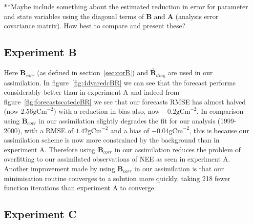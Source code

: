 \documentclass[11pt]{article}
\begin{document}
{\color{red} **Maybe include something about the estimated reduction in error for parameter and state variables using the diagonal terms of \textbf{B} and \textbf{A} (analysis error covariance matrix). How best to compare and present these?}

\subsection{Experiment B} \label{sec:expb}

Here $\textbf{B}_{corr}$ (as defined in section~\ref{sec:corB}) and $\hat{\textbf{R}}_{diag}$ are used in our assimilation. In figure~\ref{fig:4dvaredcBR} we can see that the forecast performs considerably better than in experiment A and indeed from figure~\ref{fig:forecastscatedcBR} we see that our forecasts RMSE has almost halved (now $2.56 \text{gCm}^{-2}$) with a reduction in bias also, now $-0.2 \text{gCm}^{-2}$. In comparison using $\textbf{B}_{corr}$ in our assimilation slightly degrades the fit for our analysis (1999-2000), with a RMSE of $1.42 \text{gCm}^{-2}$ and a bias of $-0.04 \text{gCm}^{-2}$, this is because our assimilation scheme is now more constrained by the background than in experiment A. Therefore using $\textbf{B}_{corr}$ in our assimilation reduces the problem of overfitting to our assimilated observations of NEE as seen in experiment A. Another improvement made by using $\textbf{B}_{corr}$ in our assimilation is that our minimisation routine converges to a solution more quickly, taking 218 fewer function iterations than experiment A to converge. 

\subsection{Experiment C} \label{sec:expc}
\end{document}
